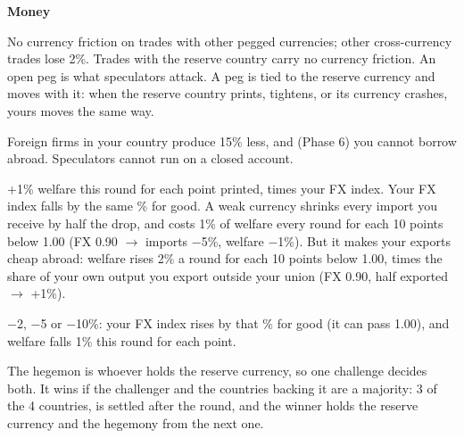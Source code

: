 \documentclass[11pt]{article}
\begin{document}
{\bfseries Money}\par
{\footnotesize
\begin{description}[nosep,style=sameline,leftmargin=5.6em,font=\normalfont\bfseries]
  \item[Peg] No currency friction on trades with other pegged currencies; other cross-currency trades lose 2\%. Trades with the reserve country carry no currency friction. An open peg is what speculators attack. A peg is tied to the reserve currency and moves with it: when the reserve country prints, tightens, or its currency crashes, yours moves the same way.
  \item[Controls] Foreign firms in your country produce 15\% less, and (Phase 6) you cannot borrow abroad. Speculators cannot run on a closed account.
  \item[Printing] +1\% welfare this round for each point printed, times your FX index. Your FX index falls by the same \% for good. A weak currency shrinks every import you receive by half the drop, and costs 1\% of welfare every round for each 10 points below 1.00 (FX 0.90 $\to$ imports $-$5\%, welfare $-$1\%). But it makes your exports cheap abroad: welfare rises 2\% a round for each 10 points below 1.00, times the share of your own output you export outside your union (FX 0.90, half exported $\to$ +1\%).
  \item[Tightening] $-$2, $-$5 or $-$10\%: your FX index rises by that \% for good (it can pass 1.00), and welfare falls 1\% this round for each point.
  \item[Challenge] The hegemon is whoever holds the reserve currency, so one challenge decides both. It wins if the challenger and the countries backing it are a majority: 3 of the 4 countries, is settled after the round, and the winner holds the reserve currency and the hegemony from the next one.
\end{description}}
\end{document}
